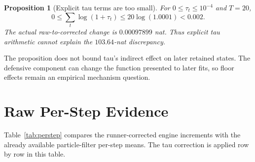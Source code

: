 \documentclass[11pt]{article}
\newtheorem{proposition}{Proposition}
\begin{document}
\begin{proposition}[Explicit tau terms are too small]\label{prop:tau}
For $0\leq\tau_t\leq10^{-4}$ and $T=20$,
\[
0\leq\sum_t\log(1+\tau_t)
\leq20\log(1.0001)<0.002.
\]
The actual raw-to-corrected change is $0.00097899$ nat. Thus explicit tau
arithmetic cannot explain the $103.64$-nat discrepancy.
\end{proposition}

The proposition does not bound tau's indirect effect on later retained
states. The defensive component can change the function presented to later
fits, so floor effects remain an empirical mechanism question.

\section{Raw Per-Step Evidence}

Table~\ref{tab:perstep} compares the runner-corrected engine increments with
the already available particle-filter per-step means. The tau correction is
applied row by row in this table.
\end{document}
